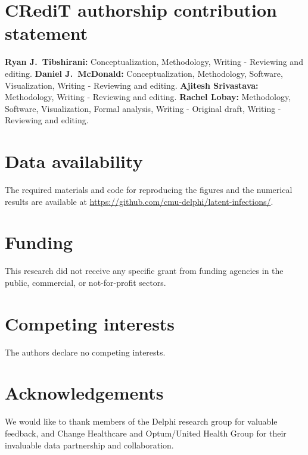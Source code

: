 \documentclass{article}
\begin{document}




\newpage 

\section*{CRediT authorship contribution statement}
\textbf{Ryan J.\ Tibshirani:} Conceptualization, Methodology, Writing - Reviewing and editing.
\textbf{Daniel J.\ McDonald:} Conceptualization, Methodology, Software, Visualization, Writing - Reviewing and editing.
\textbf{Ajitesh Srivastava:} Methodology, Writing - Reviewing and editing.
\textbf{Rachel Lobay:} Methodology, Software, Visualization, Formal analysis, Writing - Original draft, Writing - Reviewing and editing.


\section*{Data availability}
The required materials and code for reproducing the figures and the numerical results are 
available at
\href{https://github.com/cmu-delphi/latent-infections/}{https://github.com/cmu-delphi/latent-infections/}.

\section*{Funding}
This research did not receive any specific grant from funding agencies
in the public, commercial, or not-for-profit sectors.

\section*{Competing interests}

The authors declare no competing interests.

\section*{Acknowledgements}

We would like to thank members of the Delphi research group for valuable
feedback, and Change Healthcare and Optum/United Health Group for their
invaluable data partnership and collaboration. 
\end{document}
